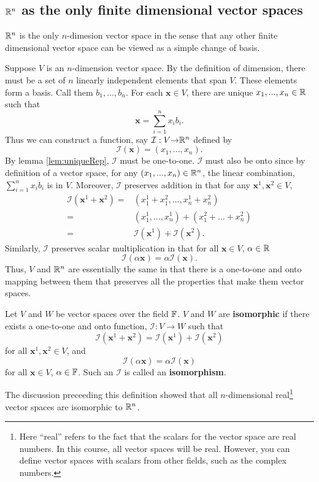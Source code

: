 \subsection{$\mathbb{R}^n$ as the  only finite dimensional vector spaces}

$\mathbb{R}^n$ is the only $n$-dimesion vector space in the sense that any
other finite dimensional vector space can be viewed as a simple change
of basis.

Suppose $V$ is an $n$-dimension vector space. By the definition of dimension,
there must be a set of $n$ linearly independent elements that span
$V$. These elements form a basis. Call them $b_1, ..., b_n$. For each
$\mathbf{x} \in V$, there are unique $x_1, ..., x_n \in \mathbb{R}$ such that 
\[ \mathbf{x} = \sum_{i=1}^n x_i b_i. \]
Thus we can construct a function, say $\mathcal{I}: V {\rightarrow} \mathbb{R}^n$ defined by 
\[ \mathcal{I}(\mathbf{x}) = (x_1, ..., x_n). \]
By lemma \ref{lem:uniqueRep}, $\mathcal{I}$ must be one-to-one. $\mathcal{I}$ must also be
onto since by definition of a vector space, for any $(x_1, ..., x_n)
\in \mathbb{R}^n$, the linear combination, $\sum_{i=1}^n x_i b_i$ is in
$V$. Moreover, $\mathcal{I}$ preserves addition in that for
any $\mathbf{x}^1, \mathbf{x}^2 \in V$,
\begin{align*}
  \mathcal{I}(\mathbf{x}^1 + \mathbf{x}^2) = & (x_1^1 + x_1^2, ..., x_n^1 + x_n^2) \\
  = & (x_1^1, ..., x_n^1) + (x_1^2 + ... + x_n^2) \\
  = & \mathcal{I}(\mathbf{x}^1) + \mathcal{I}(\mathbf{x}^2).
\end{align*}
Similarly, $\mathcal{I}$ preserves scalar multiplication in that for all $\mathbf{x} \in
V$, $\alpha \in \mathbb{R}$
\[ \mathcal{I}(\alpha \mathbf{x}) = \alpha \mathcal{I}(\mathbf{x}). \]
Thus, $V$ and $\mathbb{R}^n$ are essentially the same in that there is a
one-to-one and onto mapping between them that preserves all the
properties that make them vector spaces. 
\begin{definition}
  Let $V$ and $W$ be vector spaces over the field $\mathbb{F}$. $V$ and $W$ are
  \textbf{isomorphic} if there exists a one-to-one and onto function,
  $\mathcal{I}:V \to W$ such that 
  \[ \mathcal{I}(\mathbf{x}^1 + \mathbf{x}^2) = \mathcal{I}(\mathbf{x}^1) + \mathcal{I}(\mathbf{x}^2) \]
  for all $\mathbf{x}^1, \mathbf{x}^2 \in V$,
  and 
  \[ \mathcal{I}(\alpha \mathbf{x}) = \alpha \mathcal{I}(\mathbf{x}) \]
  for all $\mathbf{x} \in V$, $\alpha \in \mathbb{F}$.
  Such an $\mathcal{I}$ is called an \textbf{isomorphism}.
\end{definition}
The discussion preceeding this definition showed that all
$n$-dimensional real\footnote{Here ``real'' refers to the fact that
  the scalars for the vector space are real numbers. In this course,
  all vector spaces will be real. However, you can define vector
  spaces with scalars from other fields, such as the complex numbers.}
vector spaces are isomorphic to $\mathbb{R}^n$. 

